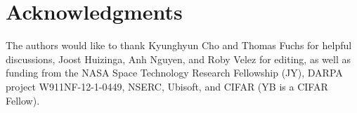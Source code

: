 
\section*{Acknowledgments}

\vspace*{-1ex}

The authors would like to thank Kyunghyun Cho and Thomas Fuchs for helpful discussions, Joost Huizinga, Anh Nguyen, and Roby Velez for editing, as well as funding from 
the NASA Space Technology Research Fellowship (JY), DARPA project W911NF-12-1-0449, NSERC, Ubisoft, and CIFAR
(YB is a CIFAR Fellow).
